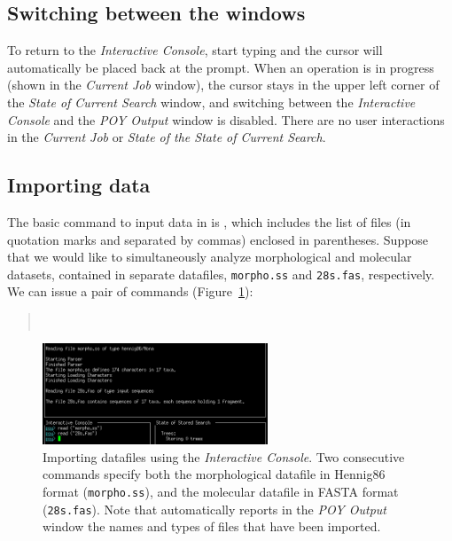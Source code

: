 \subsection{Switching between the windows}
To return to the \emph{Interactive Console}, start typing and the cursor will automatically be placed back at the \poy prompt. When an operation is in progress (shown in the \emph{Current Job} window), the cursor stays in the upper left corner of the \emph{State of Current Search} window, and switching between the \emph{Interactive Console} and the \emph{POY Output} window is disabled. There are no user interactions in the \emph{Current Job} or \emph{State of the State of Current Search}.

\subsection{Importing data} \label{sec:import}

The basic command to input data in \poy is , which includes the list of files (in quotation marks and separated by commas) enclosed in parentheses. Suppose that we would like to simultaneously analyze morphological and molecular datasets, contained in separate datafiles, \texttt{morpho.ss} and \texttt{28s.fas}, respectively. We can issue a pair of  commands (Figure~\ref{fig:readingexample}):
\begin{quote}
        \\
\end{quote}

\begin{figure}
    \begin{center}
        \includegraphics[width=0.6\textwidth]{figures/reading_example.jpg}
    \end{center}
    \caption{Importing datafiles using the \emph{Interactive Console}. Two consecutive  commands specify both the morphological datafile in Hennig86 format (\texttt{morpho.ss}), and the molecular datafile in FASTA format (\texttt{28s.fas}). Note that \poy automatically reports  in the \emph{POY Output} window the names and types of files that have been imported.}
    \label{fig:readingexample}
\end{figure}

